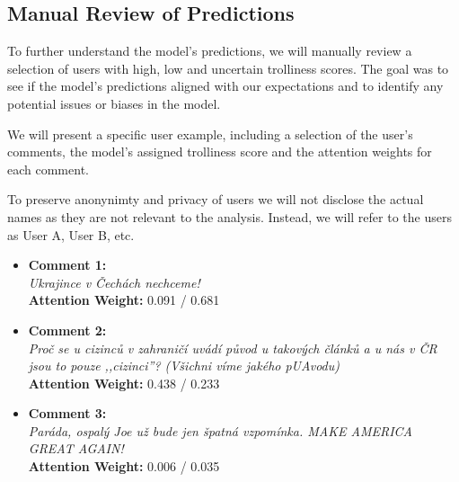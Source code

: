 \documentclass[twoside]{ctuthesis}
\theoremstyle{plain}
\theoremstyle{definition}
\theoremstyle{note}
\begin{document}
\subsection{Manual Review of Predictions}
To further understand the model's predictions, we will manually review a selection of users with high, low and uncertain trolliness scores. The goal was to see if the model's predictions aligned with our expectations and to identify any potential issues or biases in the model.\par
We will present a specific user example, including a selection of the user's comments, the model's assigned trolliness score and the attention weights for each comment. \par
To preserve anonynimty and privacy of users we will not disclose the actual names as they are not relevant to the analysis. Instead, we will refer to the users as User A, User B, etc.\par

\begin{tcolorbox}[colback=white, colframe=black, title=User A - Trolliness Score: 0.268 (Multilingual Model) / 0.960 (Russian Model)]
\begin{itemize}
    \item \textbf{Comment 1:} \\
    \textit{Ukrajince v Čechách nechceme!} \\
    \textbf{Attention Weight:} 0.091 / 0.681

    \vspace{0.2cm}

    \item \textbf{Comment 2:} \\
    \textit{Proč se u cizinců v zahraničí uvádí původ u takových článků a u nás v ČR jsou to pouze ,,cizinci''? (Všichni víme jakého pUAvodu)} \\
    \textbf{Attention Weight:} 0.438 / 0.233

    \vspace{0.2cm}

    \item \textbf{Comment 3:} \\
    \textit{Paráda, ospalý Joe už bude jen špatná vzpomínka. MAKE AMERICA GREAT AGAIN!} \\
    \textbf{Attention Weight:} 0.006 / 0.035
\end{itemize}
\end{tcolorbox}
\end{document}
